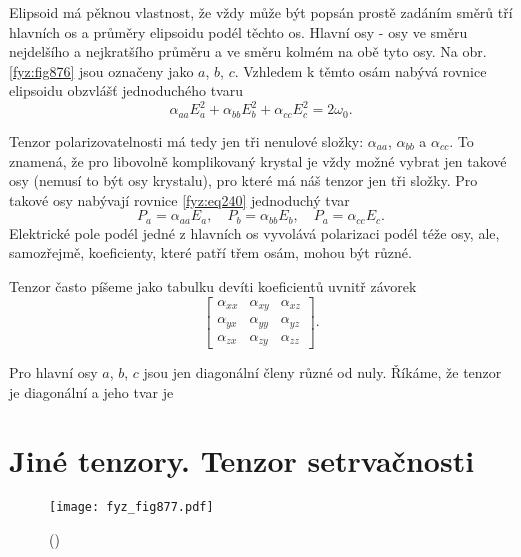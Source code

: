     Elipsoid má pěknou vlastnost, že vždy může být popsán prostě zadáním směrů tří hlavních os a
    průměry elipsoidu podél těchto os. Hlavní osy - osy ve směru nejdelšího a nejkratšího průměru a
    ve směru kolmém na obě tyto osy. Na obr. \ref{fyz:fig876} jsou označeny jako \(a\), \(b\),
    \(c\). Vzhledem k těmto osám nabývá rovnice elipsoidu obzvlášť jednoduchého tvaru
    \begin{equation*}
      \alpha_{aa}E_a^2 + \alpha_{bb}E_b^2 + \alpha_{cc}E_c^2= 2\omega_0.
    \end{equation*}

    Tenzor polarizovatelnosti má tedy jen tři nenulové složky: \(\alpha_{aa}\), \(\alpha_{bb}\) a
    \(\alpha_{cc}\). To znamená, že pro libovolně komplikovaný krystal je vždy možné vybrat jen
    takové osy (nemusí to být osy krystalu), pro které má náš tenzor jen tři složky. Pro takové osy
    nabývají rovnice \eqref{fyz:eq240} jednoduchý tvar
    \begin{equation}\label{fyz:eq832}
      P_a = \alpha_{aa}E_a,\quad P_b = \alpha_{bb}E_b,\quad P_a = \alpha_{cc}E_c.
    \end{equation}
    Elektrické pole podél jedné z hlavních os vyvolává polarizaci podél téže osy, ale, samozřejmě,
    koeficienty, které patří třem osám, mohou být různé.

    Tenzor často píšeme jako tabulku devíti koeficientů uvnitř závorek
    \begin{equation}\label{fyz:eq833}
      \begin{bmatrix}
        \alpha_{xx}& \alpha_{xy}& \alpha_{xz} \\
        \alpha_{yx}& \alpha_{yy}& \alpha_{yz} \\
        \alpha_{zx}& \alpha_{zy}& \alpha_{zz}
      \end{bmatrix}.
    \end{equation}

    Pro hlavní osy \(a\), \(b\), \(c\) jsou jen diagonální členy různé od nuly. Říkáme, že tenzor je
    diagonální a jeho tvar je

  \section{Jiné tenzory. Tenzor setrvačnosti}\label{fyz:IIchapXXXIsecIV}
    \begin{figure}[ht!] %
      \centering
      \texttt{[image: fyz\_fig877.pdf]}
      \caption{
              (\cite[s.~707]{Feynman02})}
      \label{fyz:fig877}
    \end{figure}

